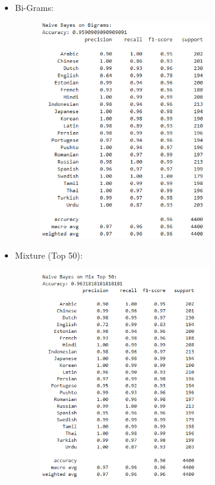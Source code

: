 \begin{itemize}
\begin{itemize}
\begin{figure}[H]
\end{figure}
\clearpage
        \item Bi-Grams:
        \begin{figure}[H]
    \centering
    \includegraphics[width=0.7\textwidth]{img/docspics/Picture22.png}
\end{figure}
\clearpage
        \item Mixture (Top 50):
        \begin{figure}[H]
    \centering
    \includegraphics[width=0.7\textwidth]{img/docspics/Picture23.png}

\end{figure}
\end{itemize}
\end{itemize}
